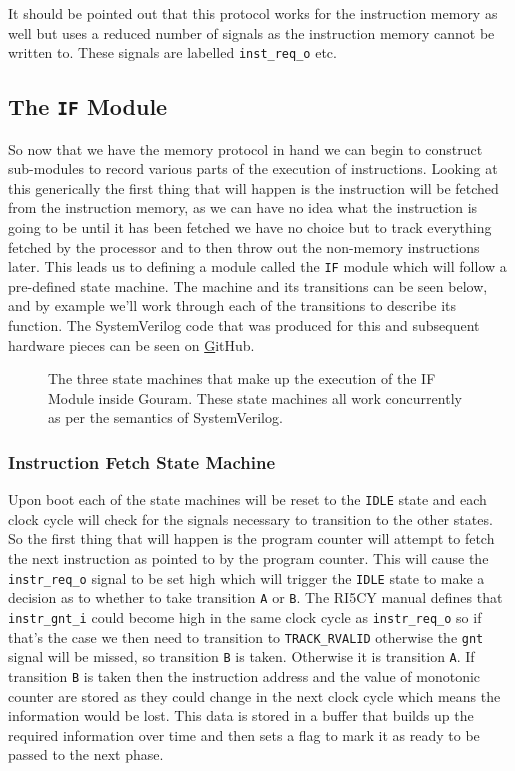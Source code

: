 It should be pointed out that this protocol works for the instruction memory as well but uses a reduced number of signals as the instruction memory cannot be written to. These signals are labelled \texttt{inst\_req\_o} etc.

\subsection{The \texttt{IF} Module}

So now that we have the memory protocol in hand we can begin to construct sub-modules to record various parts of the execution of instructions. Looking at this generically the first thing that will happen is the instruction will be fetched from the instruction memory, as we can have no idea what the instruction is going to be until it has been fetched we have no choice but to track everything fetched by the processor and to then throw out the non-memory instructions later. This leads us to defining a module called the \texttt{IF} module which will follow a pre-defined state machine. The machine and its transitions can be seen below, and by example we'll work through each of the transitions to describe its function. The SystemVerilog code that was produced for this and subsequent hardware pieces can be seen on \href{URL} GitHub.

\begin{figure}[htbp]
	
	\caption{The three state machines that make up the execution of the IF Module inside Gouram. These state machines all work concurrently as per the semantics of SystemVerilog.}
	\label{fig:if-state-machine}
\end{figure}

\subsubsection{Instruction Fetch State Machine}

Upon boot each of the state machines will be reset to the \texttt{IDLE} state and each clock cycle will check for the signals necessary to transition to the other states. So the first thing that will happen is the program counter will attempt to fetch the next instruction as pointed to by the program counter. This will cause the \texttt{instr\_req\_o} signal to be set high which will trigger the \texttt{IDLE} state to make a decision as to whether to take transition \texttt{A} or \texttt{B}. The RI5CY manual defines that \texttt{instr\_gnt\_i} could become high in the same clock cycle as \texttt{instr\_req\_o} so if that's the case we then need to transition to \texttt{TRACK\_RVALID} otherwise the \texttt{gnt} signal will be missed, so transition \texttt{B} is taken. Otherwise it is transition \texttt{A}. If transition \texttt{B} is taken then the instruction address and the value of monotonic counter are stored as they could change in the next clock cycle which means the information would be lost. This data is stored in a buffer that builds up the required information over time and then sets a flag to mark it as ready to be passed to the next phase.

